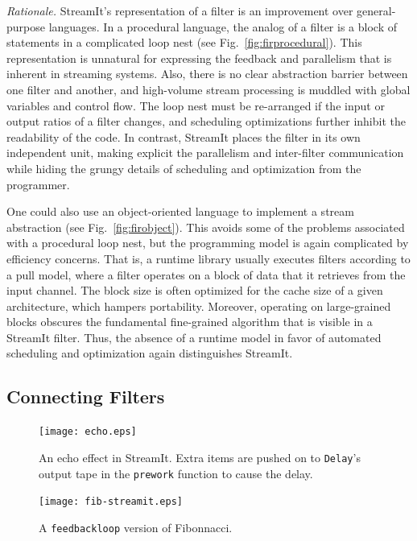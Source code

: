 \label{sec:oo-rat}
\emph{Rationale.}  StreamIt's representation of a filter is an
improvement over general-purpose languages.  In a procedural language,
the analog of a filter is a block of statements in a complicated loop
nest (see Fig.~\ref{fig:firprocedural}).  This representation is
unnatural for expressing the feedback and parallelism that is inherent
in streaming systems.  Also, there is no clear abstraction barrier
between one filter and another, and high-volume stream processing is
muddled with global variables and control flow.  The loop nest must be
re-arranged if the input or output ratios of a filter changes, and
scheduling optimizations further inhibit the readability of the code.
In contrast, StreamIt places the filter in its own independent unit,
making explicit the parallelism and inter-filter communication while
hiding the grungy details of scheduling and optimization from the
programmer.

One could also use an object-oriented language to implement a stream
abstraction (see Fig.~\ref{fig:firobject}).  This avoids some of the
problems associated with a procedural loop nest, but the programming
model is again complicated by efficiency concerns.  That is, a runtime
library usually executes filters according to a pull model, where a
filter operates on a block of data that it retrieves from the input
channel.  The block size is often optimized for the cache size of a
given architecture, which hampers portability.  Moreover, operating on
large-grained blocks obscures the fundamental fine-grained algorithm
that is visible in a StreamIt filter.  Thus, the absence of a runtime
model in favor of automated scheduling and optimization again
distinguishes StreamIt.

\subsection{Connecting Filters}
\label{sec:connecting}

\begin{figure}
\centering
\texttt{[image: echo.eps]}
\caption{An echo effect in StreamIt.  Extra items are pushed on to
  \texttt{Delay}'s output tape in the \texttt{prework} function to
  cause the delay.}
\label{fig:echo}
\end{figure}

\begin{figure}
\centering
\texttt{[image: fib-streamit.eps]}
\caption{A \texttt{feedbackloop} version of Fibonnacci.}
\label{fig:feed}
\end{figure}


